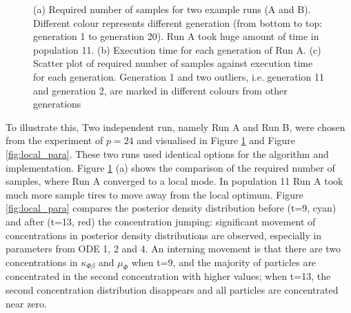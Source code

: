 \begin{figure}[ht!]
    \begin{center}
    \end{center}

    \caption[Local optimum and abnormal pattern]{(a) Required number of samples for two example runs (A and B). Different colour represents different generation (from bottom to top: generation 1 to generation 20). Run A took huge amount of time in population 11. (b) Execution time for each generation of Run A. (c) Scatter plot of required number of samples against execution time for each generation. Generation 1 and two outliers, i.e. generation 11 and generation 2, are marked in different colours from other generations}
    \label{fig:local_modes}
\end{figure}

To illustrate this, Two independent run, namely Run A and Run B, were chosen from the experiment of $p=24$ and visualised in Figure \ref{fig:local_modes} and Figure \ref{fig:local_para}. These two runs used identical options for the algorithm and implementation. Figure \ref{fig:local_modes} (a) shows the comparison of the required number of samples, where Run A converged to a local mode. In population 11 Run A took much more sample tires to move away from the local optimum. Figure \ref{fig:local_para} compares the posterior density distribution before (t=9, cyan) and after (t=13, red) the concentration jumping: significant movement of concentrations in posterior density distributions are observed, especially in parameters from ODE 1, 2 and 4. An interning movement is that there are two concentrations in $\kappa_{\Phi\beta}$ and $\mu_\Phi$ when t=9, and the majority of particles are concentrated in the second concentration with higher values; when t=13, the second concentration distribution disappears and all particles are concentrated near zero.

